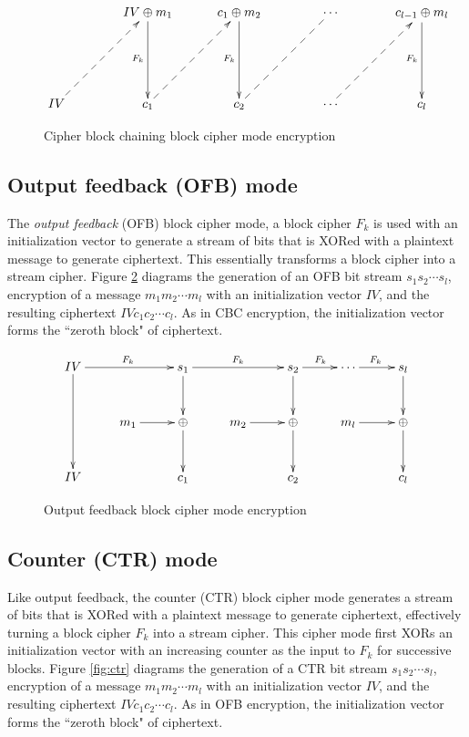 \documentclass{book}
\theoremstyle{plain}
\theoremstyle{definition}
\begin{document}
\begin{figure}[h]
\begin{center}
$$\xymatrix@!{
& IV \oplus m_1 \ar[d]_{F_k} & c_1 \oplus m_2 \ar[d]_{F_k} & \cdots & c_{l-1} \oplus m_l \ar[d]_{F_k} \\
IV \ar@{-->}[ur] & c_1 \ar@{-->}[ur] & c_2 \ar@{--}[ur] & \cdots \ar@{-->}[ur] & c_l
}$$
\caption{Cipher block chaining block cipher mode encryption}
\label{fig:cbc}
\end{center}
\end{figure}

\subsection{Output feedback (OFB) mode}
The {\it output feedback} (OFB) block cipher mode, a block cipher $F_k$ is used with an initialization vector to generate a stream of bits that is XORed with a plaintext message to generate ciphertext. This essentially transforms a block cipher into a stream cipher. Figure \ref{fig:ofb} diagrams the generation of an OFB bit stream $s_1s_2 \cdots s_l$, encryption of a message $m_1m_2 \cdots m_l$ with an initialization vector $IV$, and the resulting ciphertext $IVc_1c_2 \cdots c_l$. As in CBC encryption, the initialization vector forms the ``zeroth block" of ciphertext.

\begin{figure}[h]
\begin{center}
$$\xymatrix@!{
IV \ar[rr]^{F_k}\ar[dd] & & s_1 \ar[rr]^{F_k}\ar[d] & & s_2 \ar[r]^{F_k}\ar[d] & \cdots \ar[r]^{F_k} & s_l \ar[d] \\
& m_1 \ar[r] & \oplus \ar[d] & m_2 \ar[r] & \oplus \ar[d] & m_l \ar[r] & \oplus \ar[d] \\
IV & & c_1 & & c_2 & & c_l
}$$
\caption{Output feedback block cipher mode encryption}
\label{fig:ofb}
\end{center}
\end{figure}

\subsection{Counter (CTR) mode}
Like output feedback, the counter (CTR) block cipher mode generates a stream of bits that is XORed with a plaintext message to generate ciphertext, effectively turning a block cipher $F_k$ into a stream cipher. This cipher mode first XORs an initialization vector with an increasing counter as the input to $F_k$ for successive blocks. Figure \ref{fig:ctr} diagrams the generation of a CTR bit stream $s_1s_2 \cdots s_l$, encryption of a message $m_1m_2 \cdots m_l$ with an initialization vector $IV$, and the resulting ciphertext $IVc_1c_2 \cdots c_l$. As in OFB encryption, the initialization vector forms the ``zeroth block" of ciphertext.
\end{document}
